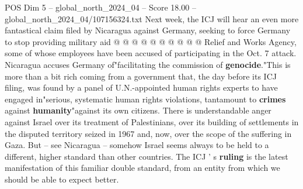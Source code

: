 \begin{textsample}{POS Dim 5 – global\_north\_2024\_04 – Score 18.00 – global\_north\_2024\_04/107156324.txt}
Next week, the ICJ will hear an even more fantastical claim filed by Nicaragua against Germany, seeking to force Germany to stop providing military aid @ @ @ @ @ @ @ @ @ @ Relief and Works Agency, some of whose employees have been accused of participating in the Oct. 7 attack.
Nicaragua accuses Germany of"facilitating the commission of \textbf{genocide}."This is more than a bit rich coming from a government that, the day before its ICJ filing, was found by a panel of U.N.-appointed human rights experts to have engaged in"serious, systematic human rights violations, tantamount to \textbf{crimes} against \textbf{humanity}"against its own citizens.
There is understandable anger against Israel over its treatment of Palestinians, over its building of settlements in the disputed territory seized in 1967 and, now, over the scope of the suffering in Gaza.
But -- see Nicaragua -- somehow Israel seems always to be held to a different, higher standard than other countries.
The ICJ ' s \textbf{ruling} is the latest manifestation of this familiar double standard, from an entity from which we should be able to expect better.

\end{textsample}
